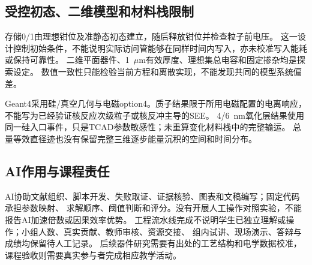 \subsection{受控初态、二维模型和材料栈限制}
存储0/1由理想钳位及准静态初态建立，随后释放钳位并检查粒子前电压。
这一设计控制初始条件，不能说明实际访问管能够在同样时间内写入，亦未校准写入能耗或保持可靠性。
二维平面器件、1~$\mu$m有效厚度、理想集总电容和固定掺杂均是探索设定。
数值一致性只能检验当前方程和离散实现，不能发现共同的模型系统偏差。

Geant4采用硅/真空几何与电磁option4。质子结果限于所用电磁配置的电离响应，
不能写为已经验证核反应次级粒子或核反冲主导的SEE。
4/6~nm氧化层结果使用同一硅入口事件，只是TCAD参数敏感性；未重算变化材料栈中的完整输运。
总量等效直径迹也没有保留完整三维逐步能量沉积的空间和时间分布。

\subsection{AI作用与课程责任}
AI协助文献组织、脚本开发、失败取证、证据核验、图表和文稿编写；固定代码承担参数映射、
求解顺序、阈值判断和评分。没有开展人工操作对照实验，不能报告AI加速倍数或因果效率优势。
工程流水线完成不说明学生已独立理解或操作；小组人数、真实贡献、教师审核、资源交接、
组内试讲、现场演示、答辩与成绩均保留待人工记录。
后续器件研究需要有出处的工艺结构和电学数据校准，课程验收则需要真实参与者完成相应教学活动。

